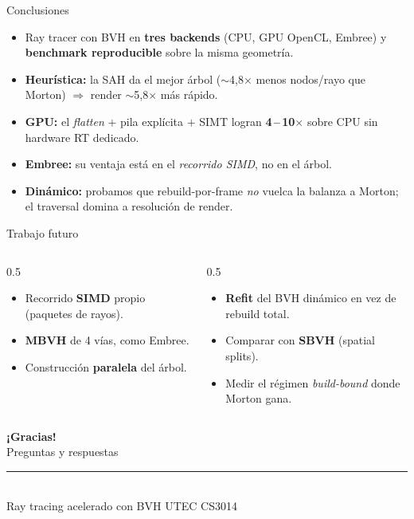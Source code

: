 \documentclass[aspectratio=169,11pt]{beamer}
\newcommand{\hl}[1]{{\color{primdk}\textbf{#1}}}
\begin{document}
\begin{frame}{Conclusiones}
\begin{itemize}\itemsep4pt
  \item Ray tracer con BVH en \hl{tres backends} (CPU, GPU OpenCL, Embree) y
        \hl{benchmark reproducible} sobre la misma geometr\'ia.
  \item \hl{Heur\'istica:} la \alert{SAH} da el mejor \'arbol
        ($\sim$4{,}8$\times$ menos nodos/rayo que Morton) $\Rightarrow$ render $\sim$5{,}8$\times$ m\'as r\'apido.
  \item \hl{GPU:} el \emph{flatten} $+$ pila expl\'icita $+$ SIMT logran \hl{4\,--\,10$\times$} sobre CPU
        sin hardware RT dedicado.
  \item \hl{Embree:} su ventaja est\'a en el \emph{recorrido SIMD}, no en el \'arbol.
  \item \hl{Din\'amico:} probamos que rebuild-por-frame \emph{no} vuelca la balanza a Morton;
        el traversal domina a resoluci\'on de render.
\end{itemize}
\end{frame}

\begin{frame}{Trabajo futuro}
\begin{columns}[T]
\begin{column}{0.5\textwidth}
\begin{itemize}\itemsep2pt
  \item Recorrido \hl{SIMD} propio (paquetes de rayos).
  \item \hl{MBVH} de 4 v\'ias, como Embree.
  \item Construcci\'on \hl{paralela} del \'arbol.
\end{itemize}
\end{column}
\begin{column}{0.5\textwidth}
\begin{itemize}\itemsep2pt
  \item \hl{Refit} del BVH din\'amico en vez de rebuild total.
  \item Comparar con \hl{SBVH} (spatial splits).
  \item Medir el r\'egimen \emph{build-bound} donde Morton gana.
\end{itemize}
\end{column}
\end{columns}
\end{frame}

\begin{frame}
\vfill\centering
{\color{primdk}\Huge\bfseries ¡Gracias!}\\[10pt]
{\color{ink}\Large Preguntas y respuestas}\\[18pt]
{\color{primdk}\rule{0.25\textwidth}{1.2pt}}\\[12pt]
{\color{mute}\small Ray tracing acelerado con BVH \textbullet{} UTEC \textbullet{} CS3014}
\vfill
\end{frame}
\end{document}
